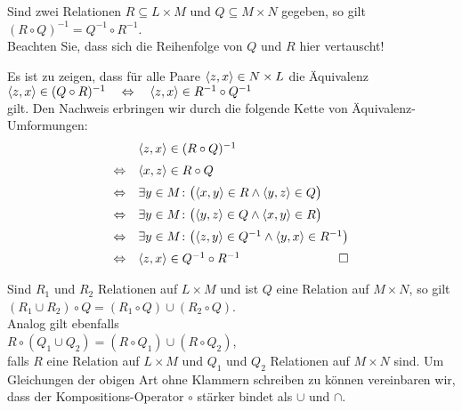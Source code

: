 \begin{Satz}
  Sind zwei Relationen $R \subseteq L \times M$ und $Q \subseteq M \times N$ gegeben, so gilt \\[0.2cm]
  \hspace*{1.3cm} $(R \circ Q)^{-1} = Q^{-1} \circ R^{-1}$. \\[0.2cm]
  Beachten Sie, dass sich die Reihenfolge von $Q$ und $R$ hier vertauscht!  
\end{Satz}

\proof
Es ist zu zeigen, dass f\"{u}r alle Paare $\pair(z,x) \in N \times L$ die  \"{A}quivalenz \\[0.2cm]
\hspace*{1.3cm} 
$\pair(z,x) \in (Q \circ R)^{-1} \quad \Leftrightarrow \quad\pair(z,x) \in R^{-1} \circ Q^{-1}$ 
\\[0.2cm]
gilt.  Den Nachweis erbringen wir durch die folgende Kette von \"{A}quivalenz-Umformungen: 
\[ 
\begin{array}{cl}
                & \pair(z,x) \in (R \circ Q)^{-1}                                             \\[0.2cm]
\Leftrightarrow & \pair(x,z) \in R \circ Q                                                    \\[0.2cm]
\Leftrightarrow & \exists y \in M \colon \bigl(\pair(x,y) \in R \wedge \pair(y,z) \in Q\bigr) \\[0.2cm]
\Leftrightarrow & \exists y \in M \colon \bigl(\pair(y,z) \in Q \wedge \pair(x,y) \in R\bigr) \\[0.2cm]
\Leftrightarrow & \exists y \in M \colon \bigl(\pair(z,y) \in Q^{-1} \wedge \pair(y,x) \in R^{-1}\bigr) 
                  \\[0.2cm]
\Leftrightarrow & \pair(z,x) \in Q^{-1} \circ R^{-1}   \hspace*{\fill} \Box 
\end{array}
\]
\pagebreak

\begin{Satz}
  Sind $R_1$ und $R_2$   Relationen auf $L \times M$ und ist $Q$ eine Relation auf $M \times N$, so
  gilt \\[0.2cm] 
  \hspace*{1.3cm}
  $(R_1 \cup R_2) \circ Q = (R_1 \circ Q) \cup (R_2 \circ Q)$. 
  \\[0.2cm]
  Analog gilt ebenfalls \\[0.2cm]
  \hspace*{1.3cm} 
  $R \circ (Q_1 \cup Q_2) = (R \circ Q_1) \cup (R \circ Q_2)$, 
  \\[0.2cm]
  falls $R$ eine Relation auf $L \times M$ und $Q_1$ und $Q_2$ Relationen auf $M \times N$
  sind.  Um Gleichungen der obigen Art ohne Klammern schreiben zu k\"{o}nnen vereinbaren wir, dass der 
  Kompositions-Operator $\circ$ st\"{a}rker bindet als $\cup$ und $\cap$.  
\end{Satz}

